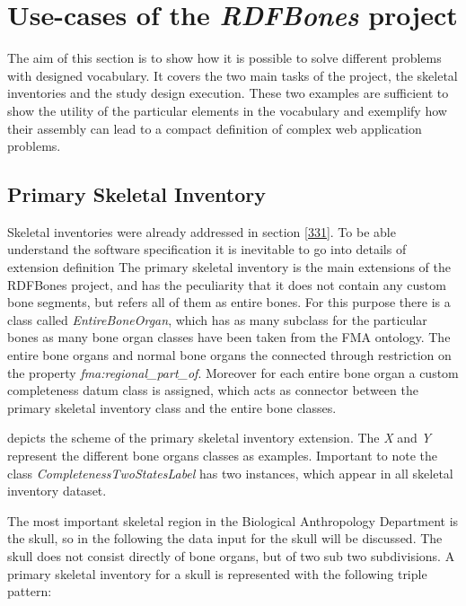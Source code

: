 
\section{Use-cases of the \textit{RDFBones} project}

The aim of this section is to show how it is possible to solve different problems with designed vocabulary. It covers the two main tasks of the project, the skeletal inventories and the study design execution. These two examples are sufficient to show the utility of the particular elements in the vocabulary and exemplify how their assembly can lead to a compact definition of complex web application problems. 

\subsection{Primary Skeletal Inventory}

Skeletal inventories were already addressed in section \ref{331}. To be able understand the software specification it is inevitable to go into details of extension definition  The primary skeletal inventory is the main extensions of the RDFBones project, and has the peculiarity that it does not contain any custom bone segments, but refers all of them as entire bones. For this purpose there is a class called \textit{EntireBoneOrgan}, which has as many subclass for the particular bones as many bone organ classes have been taken from the FMA ontology. The entire bone organs and normal bone organs the connected through restriction on the property \textit{fma:regional\_part\_of}. Moreover for each entire bone organ a custom completeness datum class is assigned, which acts as connector between the primary skeletal inventory class and the entire bone classes. 


 depicts the scheme of the primary skeletal inventory extension. The \textit{X} and \textit{Y} represent the different bone organs classes as examples. Important to note the class \textit{CompletenessTwoStatesLabel}  has two instances, which appear in all skeletal inventory dataset.

The most important skeletal region in the Biological Anthropology Department is the skull, so in the following the data input for the skull will be discussed. The skull does not consist directly of bone organs, but of two sub two subdivisions. A primary skeletal inventory for a skull is represented with the following triple pattern: 

